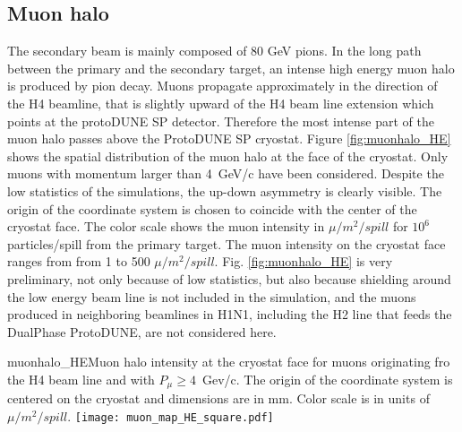 \subsection{Muon halo}
The secondary beam is mainly composed of 80 GeV pions. In the long path  between the primary and the secondary target,
 an intense high energy muon halo is produced by pion decay. Muons propagate approximately in the direction of the H4 beamline, 
 that is slightly upward of the H4 beam line extension which points at the protoDUNE SP detector.  
 Therefore the most intense part of the muon halo passes above the ProtoDUNE SP cryostat. 
Figure \ref{fig:muonhalo_HE} shows the spatial distribution of the muon halo at the face of the cryostat. Only muons with momentum larger than 4~GeV/c have been considered. Despite the low statistics of the simulations, the up-down asymmetry is clearly visible. The origin of the coordinate system is chosen to coincide with the center of the cryostat face. The color scale shows the muon intensity in $\mu /m^2/spill$ for $10^6$ particles/spill from the primary target. The muon intensity on the cryostat face ranges from  from 1 to 500  $\mu /m^2/spill$.
Fig. \ref{fig:muonhalo_HE}  is very preliminary, not only because of low statistics, but also because shielding around the low energy beam line is not included in the simulation, and the muons produced in neighboring beamlines in H1N1, including the H2 line that feeds the DualPhase ProtoDUNE, are not considered here. 
\begin{cdrfigure}{muonhalo_HE}{Muon halo intensity at the cryostat face for muons originating fro the H4 beam line and with $P_\mu  \ge 4$~Gev/c. The origin of the coordinate system is centered on the cryostat and dimensions are in mm. Color scale is in units of $\mu /m^2/spill$.}
\texttt{[image: muon\_map\_HE\_square.pdf]}
\end{cdrfigure}




